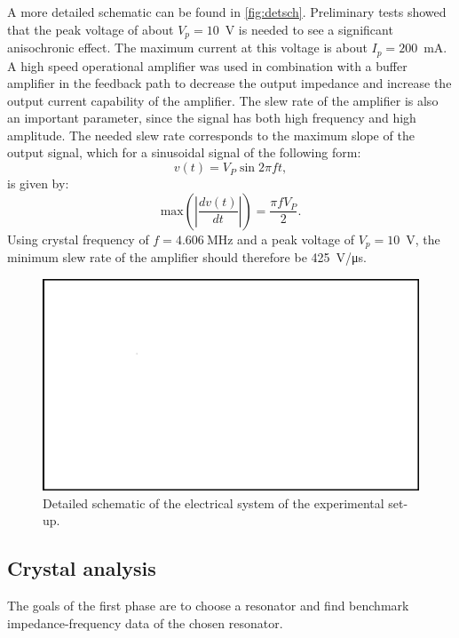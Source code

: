 A more detailed schematic can be found in \autoref{fig:detsch}. Preliminary tests showed that the peak voltage of about $V_{p}=10$~V is needed to see a significant anisochronic effect. The maximum current at this voltage is about $I_{p}=200$~mA. A high speed operational amplifier was used in combination with a buffer amplifier in the feedback path to decrease the output impedance and increase the output current capability of the amplifier. The slew rate of the amplifier is also an important parameter, since the signal has both high frequency and high amplitude. The needed slew rate corresponds to the maximum slope of the output signal, which for a sinusoidal signal of the following form:
\begin{equation}\label{eq:driving}
v(t) = V_{P} \sin{2\pi ft},
\end{equation}
is given by:
\begin{equation}\label{eq:slewrate}
\mbox{max}\left(\left|\frac{dv(t)}{dt}\right|\right) = \frac{\pi fV_{P}}{2}.
\end{equation}
Using crystal frequency of $f=\SI{4.606}{\mega\hertz}$ and a peak voltage of $V_{p}=10$~V, the minimum slew rate of the amplifier should therefore be \SI{425}{\volt/\micro\second}. 



\begin{figure}
	\centering
		\includegraphics[width=\textwidth]{figures/placeholder.png}
	\caption{Detailed schematic of the electrical system of the experimental set-up. }
	\label{fig:detsch}
\end{figure}

\subsection{Crystal analysis}
The goals of the first phase are to choose a resonator and find benchmark impedance-frequency data of the chosen resonator. 

